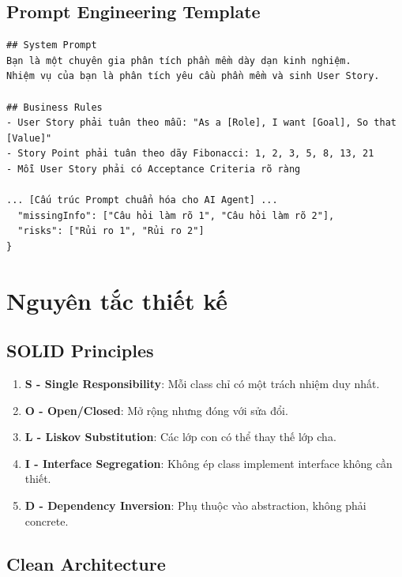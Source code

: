 \documentclass[12pt,a4paper]{report}
\begin{document}
\subsection{Prompt Engineering Template}

\begin{verbatim}
## System Prompt
Bạn là một chuyên gia phân tích phần mềm dày dạn kinh nghiệm.
Nhiệm vụ của bạn là phân tích yêu cầu phần mềm và sinh User Story.

## Business Rules
- User Story phải tuân theo mẫu: "As a [Role], I want [Goal], So that [Value]"
- Story Point phải tuân theo dãy Fibonacci: 1, 2, 3, 5, 8, 13, 21
- Mỗi User Story phải có Acceptance Criteria rõ ràng

... [Cấu trúc Prompt chuẩn hóa cho AI Agent] ...
  "missingInfo": ["Câu hỏi làm rõ 1", "Câu hỏi làm rõ 2"],
  "risks": ["Rủi ro 1", "Rủi ro 2"]
}
\end{verbatim}

\section{Nguyên tắc thiết kế}

\subsection{SOLID Principles}

\begin{enumerate}
\item \textbf{S - Single Responsibility}: Mỗi class chỉ có một trách nhiệm duy nhất.
\item \textbf{O - Open/Closed}: Mở rộng nhưng đóng với sửa đổi.
\item \textbf{L - Liskov Substitution}: Các lớp con có thể thay thế lớp cha.
\item \textbf{I - Interface Segregation}: Không ép class implement interface không cần thiết.
\item \textbf{D - Dependency Inversion}: Phụ thuộc vào abstraction, không phải concrete.
\end{enumerate}

\subsection{Clean Architecture}
\end{document}
